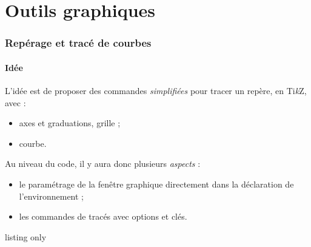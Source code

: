 \documentclass[a4paper,french,11pt]{article}
\providecommand\tikzlogo{Ti\textit{k}Z}
\let\TikZ\tikzlogo
\newcommand\cmaj[1]{%
	{\tcbox[vignetteMaJ]{#1}\xspace}%
}
\begin{document}
\newpage

\part{Outils graphiques}

\section{Repérage et tracé de courbes}\label{reperagetikz}

\subsection{Idée}

\begin{tipblock}
\cmaj{2.1.1} L'idée est de proposer des commandes \textit{simplifiées} pour tracer un repère, en \TikZ, avec :

\begin{itemize}
	\item axes et graduations, grille ;
	\item courbe.
\end{itemize}
\vspace*{-\baselineskip}\leavevmode
\end{tipblock}

\begin{noteblock}
Au niveau du code, il y aura donc plusieurs \textit{aspects} :

\begin{itemize}
	\item le paramétrage de la fenêtre graphique directement dans la déclaration de l'environnement ;
	\item les commandes de tracés avec options et clés.
\end{itemize}
\vspace*{-\baselineskip}\leavevmode
\end{noteblock}

\begin{PresCodeTexPL}{listing only}
\end{PresCodeTexPL}
\end{document}
